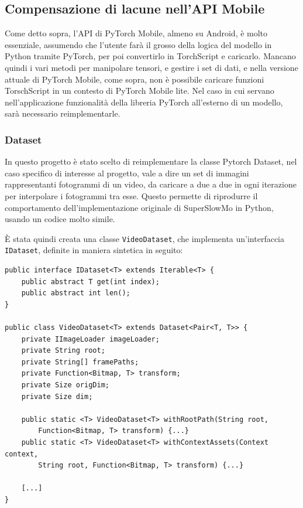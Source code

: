 \subsection{Compensazione di lacune nell'API Mobile}

Come detto sopra, l'API di PyTorch Mobile, almeno su Android, è molto essenziale, assumendo
che l'utente farà il grosso della logica del modello in Python tramite PyTorch, per poi
convertirlo in TorchScript e caricarlo. Mancano quindi i vari metodi per manipolare tensori,
e gestire i set di dati, e nella versione attuale di PyTorch Mobile, come sopra, non è possibile
caricare funzioni TorschScript in un contesto di PyTorch Mobile lite. Nel caso in cui servano 
nell'applicazione funzionalità della libreria PyTorch all'esterno di un modello, sarà necessario
reimplementarle.

\subsubsection*{Dataset}

In questo progetto è stato scelto di reimplementare la classe Pytorch Dataset, 
nel caso specifico di interesse al progetto, vale a dire un set di immagini rappresentanti
fotogrammi di un video, da caricare a due a due in ogni iterazione per interpolare i fotogrammi
tra esse. Questo permette di riprodurre il comportamento dell'implementazione originale di
SuperSlowMo in Python, usando un codice molto simile.

È stata quindi creata una classe \texttt{VideoDataset}, che implementa un'interfaccia 
\texttt{IDataset}, definite in maniera sintetica in seguito:

\begin{lstlisting}
public interface IDataset<T> extends Iterable<T> {
    public abstract T get(int index);
    public abstract int len();
}

public class VideoDataset<T> extends Dataset<Pair<T, T>> {
    private IImageLoader imageLoader;
    private String root;
    private String[] framePaths;
    private Function<Bitmap, T> transform;
    private Size origDim;
    private Size dim;

    public static <T> VideoDataset<T> withRootPath(String root, 
        Function<Bitmap, T> transform) {...}
    public static <T> VideoDataset<T> withContextAssets(Context context, 
        String root, Function<Bitmap, T> transform) {...}

    [...]
}
\end{lstlisting}

